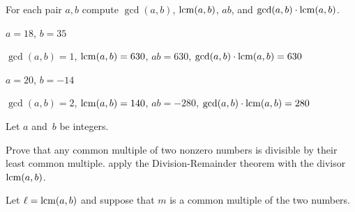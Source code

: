 \documentclass{ibl}  %
\begin{document}
\begin{euclidproof}
\begin{problem}
For each pair $a,b$ compute $\gcd(a,b)$, $\operatorname{lcm}(a,b)$, $ab$, and
$\gcd(a,b)\cdot\operatorname{lcm}(a,b)$.
\begin{exes}
\begin{exercise} 
  $a=18$, $b=35$
\end{exercise}  
\begin{answer}
  $\gcd(a,b)=1$, $\operatorname{lcm}(a,b)=630$, $ab=630$, $\gcd(a,b)\cdot\operatorname{lcm}(a,b)=630$
\end{answer}
\begin{exercise} 
  $a=20$, $b=-14$
\end{exercise}
\begin{answer}
  $\gcd(a,b)=2$, $\operatorname{lcm}(a,b)=140$, $ab=-280$, $\gcd(a,b)\cdot\operatorname{lcm}(a,b)=280$  
\end{answer}
\end{exes}
\end{problem}

\begin{problem} Let $a$ and~$b$ be integers.
\begin{exes}  %
\begin{exercise} 
   Prove that any common multiple of two nonzero
   numbers is divisible by their 
  least common multiple.
  \hint apply the Division-Remainder theorem with the divisor $\operatorname{lcm}(a,b)$.
\end{exercise}
\begin{answer}
  Let $\ell=\operatorname{lcm}(a,b)$ and suppose that $m$ is a common multiple
  of the two numbers.


\end{answer}
\end{exes}
\end{problem}
\end{euclidproof}
\end{document}
